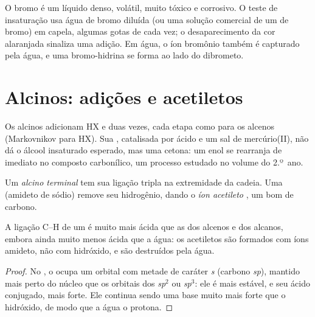\begin{inthelab}
O bromo é um líquido denso, volátil, muito tóxico e corrosivo. O teste de
insaturação usa água de bromo diluída (ou uma solução comercial de um
 de bromo) em capela, algumas gotas de cada vez; o
desaparecimento da cor alaranjada sinaliza uma adição. Em água, o íon
bromônio também é capturado pela água, e uma bromo-hidrina se forma ao
lado do dibrometo.
\end{inthelab}

\section{Alcinos: adições e acetiletos}

Os alcinos adicionam HX e  duas vezes, cada etapa como para os
alcenos (Markovnikov para HX). Sua , catalisada por ácido e um
sal de mercúrio(II), não dá o álcool insaturado esperado, mas uma cetona:
um enol se rearranja de imediato no composto carbonílico, um processo
estudado no volume do 2.º~ano.

\begin{definition}\label{def:b1:electrophilic-additions:acetylide}
Um \emph{alcino terminal}  tem sua
ligação tripla na extremidade da cadeia. Uma  (amideto de
sódio) remove seu hidrogênio, dando o \emph{íon acetileto}
, um bom  de carbono.
\end{definition}

\begin{proposition}\label{prop:b1:electrophilic-additions:acetylide-acidity}
A ligação C--H de um  é muito mais ácida que as dos
alcenos e dos alcanos, embora ainda muito menos ácida que a água: os
acetiletos são formados com íons amideto, não com hidróxido, e são
destruídos pela água.
\end{proposition}

\begin{proof}
No , o  ocupa um orbital com metade de
caráter \textit{s} (carbono \textit{sp}), mantido mais perto do núcleo que
os orbitais dos  \textit{sp}$^2$ ou \textit{sp}$^3$: ele é mais
estável, e seu ácido conjugado, mais forte. Ele continua sendo uma base
muito mais forte que o hidróxido, de modo que a água o protona.
\end{proof}

